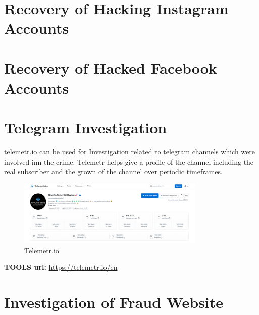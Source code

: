\documentclass[11pt]{article}
\begin{document}
\tableofcontents
\thispagestyle{empty}
\clearpage

\setcounter{page}{1}



\section{\textbf{Recovery of Hacking Instagram Accounts}}


\section{\textbf{Recovery of Hacked Facebook Accounts}}

\section{\textbf{Telegram Investigation}}
\url{telemetr.io} can be used for Investigation related to telegram channels which were involved inn the crime.
Telemetr helps give a profile of the channel including the real subscriber and the grown of the channel over periodic timeframes.

\begin{figure}[H]
    \centering
    \includegraphics[width=0.8\textwidth]{./imgs/telemetrio2.png}
    \caption{Telemetr.io}
    \label{fig:telemetr}
\end{figure}

\textbf{TOOLS url:} \url{https://telemetr.io/en}

\section{\textbf{Investigation of Fraud Website}}
\end{document}
